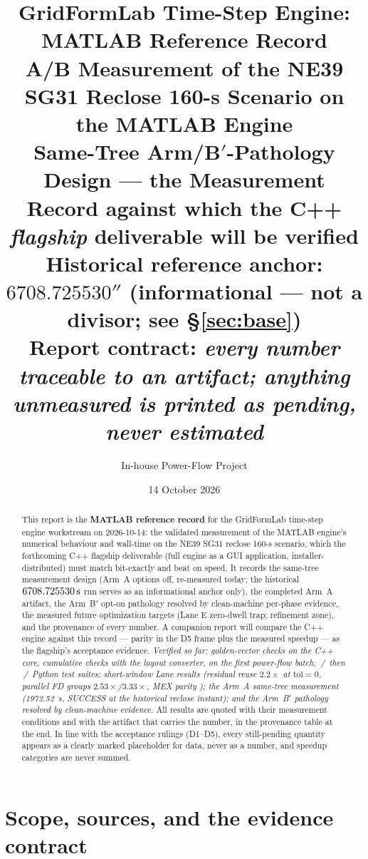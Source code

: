 \documentclass[12pt,a4paper]{article}
\title{\textbf{GridFormLab Time-Step Engine: MATLAB Reference Record}\\[1mm]
\large A/B Measurement of the NE39 SG31 Reclose 160-s Scenario on the
MATLAB Engine\\[0.5mm]
\normalsize Same-Tree Arm/B$'$-Pathology Design --- the Measurement Record
against which the C++ \emph{flagship} deliverable will be verified\\[0.5mm]
\normalsize Historical reference anchor: $6708.725530\second{}$
(informational --- not a divisor; see \S\ref{sec:base})\\[2mm]
\normalsize Report contract: \emph{every number traceable to an artifact;
anything unmeasured is printed as pending, never estimated}}
\author{In-house Power-Flow Project}
\date{14 October 2026}
\newcommand{\second}{\ifmmode\,\mathrm{s}\else\ s\fi}
\newcommand{\code}[1]{\texttt{\detokenize{#1}}}
\begin{document}
\maketitle

\begin{abstract}
This report is the \textbf{MATLAB reference record} for the GridFormLab
time-step engine workstream on 2026-10-14: the validated measurement of the
MATLAB engine's numerical behaviour and wall-time on the NE39 SG31 reclose
160-s scenario, which the forthcoming C++ flagship deliverable (full engine
as a GUI application, installer-distributed) must match bit-exactly and
beat on speed.  It records the same-tree measurement design (Arm~A options
off, re-measured today; the historical $6708.725530\second$ run serves as
an informational anchor only), the completed Arm~A artifact, the Arm~B$'$
opt-on pathology resolved by clean-machine per-phase evidence, the
measured future optimization targets (Lane E zero-dwell trap; refinement
zone), and the provenance of every number.  A companion report will
compare the C++ engine against this record --- parity in the D5 frame plus
the measured speedup --- as the flagship's acceptance evidence.
\emph{Verified so far: \code{25/25} golden-vector checks on the C++ core,
\code{35/35} cumulative checks with the layout converter, \code{62/62} on the
first power-flow batch, \code{148}\,/\,\code{0} then \code{170}\,/\,\code{0}
Python test suites; short-window Lane results (residual reuse
$\mathbf{2.2\times}$ at $\mathrm{tol}=0$, parallel FD groups
$\mathbf{2.53\times}$/$\mathbf{3.33\times}$, MEX parity \code{4/4}); the
Arm~A same-tree measurement (1972.52~s, SUCCESS at the historical reclose
instant); and the Arm~B$'$ pathology resolved by clean-machine evidence.}
All results are quoted with their measurement conditions and with the
artifact that carries the number, in the provenance table at the end.  In
line with the acceptance rulings (D1--D5), every still-pending quantity
appears as a clearly marked placeholder for data, never as a number, and
speedup categories are never summed.
\end{abstract}

\newpage
\tableofcontents
\newpage

\section{Scope, sources, and the evidence contract}\label{sec:scope}
\end{document}
